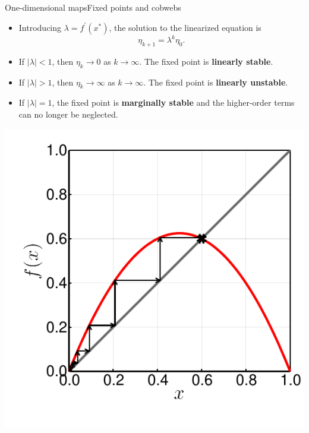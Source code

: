 \documentclass[usenames,dvipsnames,svgnames,10pt,aspectratio=169]{beamer}
\begin{document}
\begin{frame}[t, c]{One-dimensional maps}{Fixed points and cobwebs}
	\begin{minipage}{.68\textwidth}
		\begin{itemize}
			\item Introducing \( \lambda = f^{\prime} \left( x^* \right) \), the solution to the linearized equation is
			\[
				\eta_{k+1} = \lambda^k \eta_0.
			\]

			\item If \( \vert \lambda \vert < 1 \), then \( \eta_{k} \to 0 \) as \( k \to \infty \).
			The fixed point is \textbf{linearly stable}.

			\medskip

			\item If \( \vert \lambda \vert > 1 \), then \( \eta_{k} \to \infty \) as \( k \to \infty \).
			The fixed point is \textbf{linearly unstable}.

			\medskip

			\item If \( \vert \lambda \vert = 1 \), the fixed point is \textbf{marginally stable} and the higher-order terms can no longer be neglected.
		\end{itemize}
	\end{minipage}%
	\hfill
	\begin{minipage}{.28\textwidth}
		\centering
		\includegraphics[width=\textwidth]{cobweb_logistic_map}
	\end{minipage}

	\vspace{1cm}
\end{frame}
\end{document}
